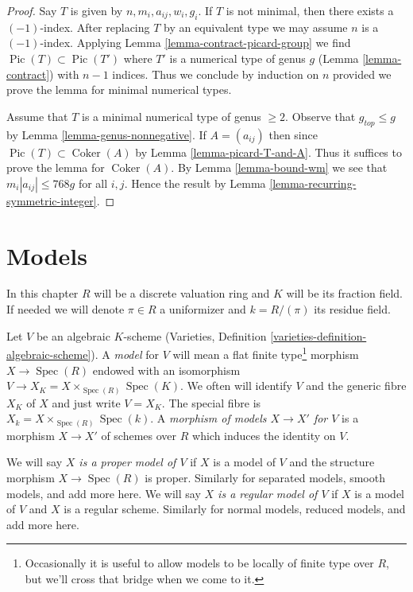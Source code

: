 \documentclass{stacks-project}
\theoremstyle{plain}
\theoremstyle{definition}
\theoremstyle{remark}
\numberwithin{equation}{subsection}
\def\Spec{\mathop{\mathrm{Spec}}}
\def\Coker{\mathop{\mathrm{Coker}}}
\def\Pic{\mathop{\mathrm{Pic}}\nolimits}
\begin{document}
\begin{proof}
Say $T$ is given by $n, m_i, a_{ij}, w_i, g_i$.
If $T$ is not minimal, then there exists a $(-1)$-index.
After replacing $T$ by an equivalent type we may assume
$n$ is a $(-1)$-index. Applying Lemma \ref{lemma-contract-picard-group}
we find $\Pic(T) \subset \Pic(T')$ where $T'$
is a numerical type of genus $g$ (Lemma \ref{lemma-contract})
with $n - 1$ indices. Thus we conclude by induction on $n$
provided we prove the lemma for minimal numerical types.

\medskip\noindent
Assume that $T$ is a minimal numerical type of genus $\geq 2$.
Observe that $g_{top} \leq g$ by Lemma \ref{lemma-genus-nonnegative}.
If $A = (a_{ij})$ then since $\Pic(T) \subset \Coker(A)$
by Lemma \ref{lemma-picard-T-and-A}. Thus it suffices to prove
the lemma for $\Coker(A)$.
By Lemma \ref{lemma-bound-wm} we see that $m_i|a_{ij}| \leq 768g$ for
all $i, j$.
Hence the result by Lemma \ref{lemma-recurring-symmetric-integer}.
\end{proof}







\section{Models}
\label{section-models}

\noindent
In this chapter $R$ will be a discrete valuation ring and $K$ will
be its fraction field. If needed we will denote $\pi \in R$ a
uniformizer and $k = R/(\pi)$ its residue field.

\medskip\noindent
Let $V$ be an algebraic $K$-scheme
(Varieties, Definition \ref{varieties-definition-algebraic-scheme}).
A {\it model} for $V$ will
mean a flat finite type\footnote{Occasionally it is useful to
allow models to be locally of finite type over $R$, but we'll
cross that bridge when we come to it.}
morphism $X \to \Spec(R)$ endowed with
an isomorphism $V \to X_K = X \times_{\Spec(R)} \Spec(K)$. We often
will identify $V$ and the generic fibre $X_K$ of $X$ and
just write $V = X_K$.
The special fibre is $X_k = X \times_{\Spec(R)} \Spec(k)$.
A {\it morphism of models $X \to X'$ for $V$}
is a morphism $X \to X'$ of schemes over $R$ which induces
the identity on $V$.

\medskip\noindent
We will say {\it $X$ is a proper model of $V$} if $X$ is a model
of $V$ and the structure morphism $X \to \Spec(R)$ is proper.
Similarly for separated models, smooth models, and add more here.
We will say {\it $X$ is a regular model of $V$} if $X$ is a model
of $V$ and $X$ is a regular scheme.
Similarly for normal models, reduced models, and add more here.
\end{document}
